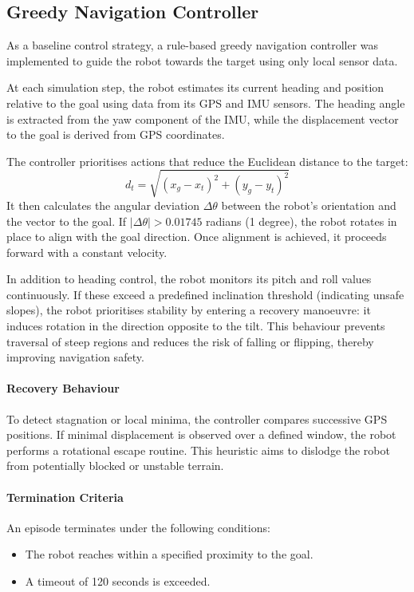 \documentclass[11pt,twocolumn]{article}
\begin{document}
\subsection{Greedy Navigation Controller}

As a baseline control strategy, a rule-based greedy navigation controller was implemented to guide the robot towards the target using only local sensor data.

At each simulation step, the robot estimates its current heading and position relative to the goal using data from its GPS and IMU sensors. The heading angle is extracted from the yaw component of the IMU, while the displacement vector to the goal is derived from GPS coordinates.

The controller prioritises actions that reduce the Euclidean distance to the target:
\[
d_t = \sqrt{(x_g - x_t)^2 + (y_g - y_t)^2}
\]
It then calculates the angular deviation $\Delta\theta$ between the robot's orientation and the vector to the goal. If $|\Delta\theta| > 0.01745$ radians (1 degree), the robot rotates in place to align with the goal direction. Once alignment is achieved, it proceeds forward with a constant velocity.

In addition to heading control, the robot monitors its pitch and roll values continuously. If these exceed a predefined inclination threshold (indicating unsafe slopes), the robot prioritises stability by entering a recovery manoeuvre: it induces rotation in the direction opposite to the tilt. This behaviour prevents traversal of steep regions and reduces the risk of falling or flipping, thereby improving navigation safety.

\paragraph{Recovery Behaviour}

To detect stagnation or local minima, the controller compares successive GPS positions. If minimal displacement is observed over a defined window, the robot performs a rotational escape routine. This heuristic aims to dislodge the robot from potentially blocked or unstable terrain.

\paragraph{Termination Criteria}

An episode terminates under the following conditions:

\begin{itemize}
    \item The robot reaches within a specified proximity to the goal.
    \item A timeout of 120 seconds is exceeded.
\end{itemize}
\end{document}
